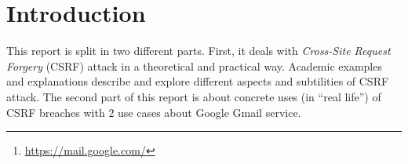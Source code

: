 \documentclass[a4paper,11pt,openany]{report}
\newcommand{\csrf}{\textit{Cross-Site Request Forgery}}
\begin{document}
\begin{abstract}
  In a second part, we focused our attention on concrete applications of CSRF vulnerabilities. 
  Lots of companies were affected in the past and we decided to deal with Google well-known 
  stories about CSRF. Indeed, 2 different vulnerabilities were discovered in 2007 concerning 
  Gmail \footnote{\url{https://mail.google.com/}} email service.
  
  Finally, we implemented a small webapp with different services, either vulnerable or protected 
  from CSRF attack. This webapp associated with an attacker website, both developped from scratch, 
  outline different practical examples of the attack and different ways to prevent it.
  \end{abstract}
  

\tableofcontents{} %
\clearpage %
\setcounter{page}{1} %

  

  \section{Introduction}
  This report is split in two different parts. First, it deals with \csrf{} (CSRF) attack in 
  a theoretical and practical way. Academic examples and explanations describe and explore 
  different aspects and subtilities of CSRF attack. The second part of this report is about concrete 
  uses (in ``real life'') of CSRF breaches with 2 use cases about Google Gmail service.
\end{document}
